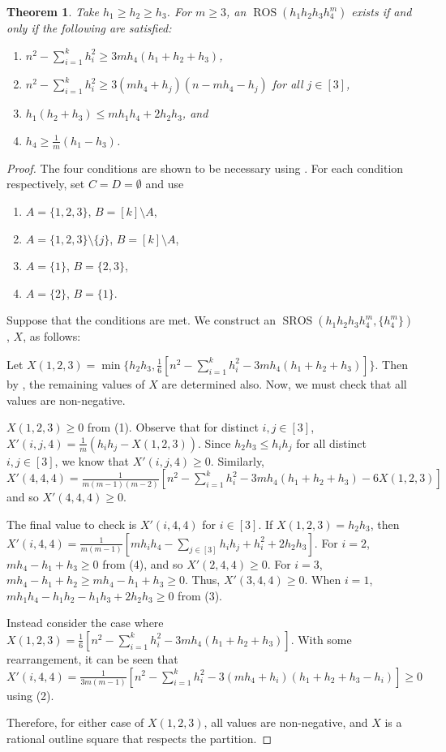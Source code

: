 \documentclass[preprint,nonatbib]{elsarticle}
\DeclareMathOperator{\ROS}{ROS}
\DeclareMathOperator{\SROS}{SROS}
\newtheorem{theorem}{Theorem}[section]
\theoremstyle{definition}
\numberwithin{equation}{section}
\begin{document}
\begin{theorem}
    Take $h_1\geq h_2\geq h_3$. For $m\geq 3$, an $\ROS(h_1 h_2 h_3 h_4^m)$ exists if and only if the following are satisfied:
    \begin{enumerate}[label=\textup{(\arabic*)}]
        \item $n^2 - \sum_{i=1}^k h_i^2\geq 3mh_4(h_1+h_2+h_3)$,
        \item $n^2 - \sum_{i=1}^k h_i^2\geq 3(mh_4 + h_j)(n-mh_4-h_j)$ for all $j\in[3]$,
        \item $h_1(h_2+h_3)\leq mh_1h_4 + 2h_2h_3$, and
        \item $h_4 \geq \frac{1}{m}(h_1-h_3)$.
    \end{enumerate}
\end{theorem}
\begin{proof}
    The four conditions are shown to be necessary using . For each condition respectively, set $C=D=\emptyset$ and use
    \begin{enumerate}[label=\textup{(\arabic*)}]
        \item $A = \{1,2,3\}$, $B = [k]\setminus A$,
        \item $A = \{1,2,3\}\setminus\{j\}$, $B = [k]\setminus A$,
        \item $A = \{1\}$, $B = \{2,3\}$,
        \item $A = \{2\}$, $B = \{1\}$.
    \end{enumerate}

    Suppose that the conditions are met. We construct an $\SROS(h_1h_2h_3h_4^m,\{h_4^m\})$, $X$, as follows:

    Let $X(1,2,3) = \min\{h_2h_3,\frac{1}{6}[n^2 - \sum_{i=1}^k h_i^2 - 3mh_4(h_1+h_2+h_3)]\}$. Then by , the remaining values of $X$ are determined also. Now, we must check that all values are non-negative.

    $X(1,2,3)\geq 0$ from (1).
    Observe that for distinct $i,j\in [3]$, $X'(i,j,4) = \frac{1}{m}(h_ih_j - X(1,2,3))$. Since $h_2h_3\leq h_ih_j$ for all distinct $i,j\in[3]$, we know that $X'(i,j,4)\geq 0$. Similarly, $X'(4,4,4) = \frac{1}{m(m-1)(m-2)}[n^2 - \sum_{i=1}^k h_i^2 - 3mh_4(h_1+h_2+h_3) - 6X(1,2,3)]$ and so $X'(4,4,4)\geq 0$.

    The final value to check is $X'(i,4,4)$ for $i\in[3]$. 
    If $X(1,2,3) = h_2h_3$, then $X'(i,4,4) = \frac{1}{m(m-1)}[mh_ih_4 - \sum_{j\in[3]}h_ih_j + h_i^2 +2h_2h_3]$. For $i=2$, $mh_4 - h_1 + h_3 \geq 0$ from (4), and so $X'(2,4,4)\geq 0$. For $i=3$, $mh_4 - h_1 + h_2 \geq mh_4 - h_1 + h_3 \geq 0$. Thus, $X'(3,4,4)\geq 0$. When $i=1$, $mh_1h_4 - h_1h_2 - h_1h_3 + 2h_2h_3\geq 0$ from (3).

    Instead consider the case where $X(1,2,3) = \frac{1}{6}[n^2 - \sum_{i=1}^k h_i^2 - 3mh_4(h_1+h_2+h_3)]$. With some rearrangement, it can be seen that $X'(i,4,4) = \frac{1}{3m(m-1)}[n^2 - \sum_{i=1}^k h_i^2 - 3(mh_4+h_i)(h_1+h_2+h_3-h_i)]\geq 0$ using (2).

    Therefore, for either case of $X(1,2,3)$, all values are non-negative, and $X$ is a rational outline square that respects the partition.
\end{proof}
\end{document}
